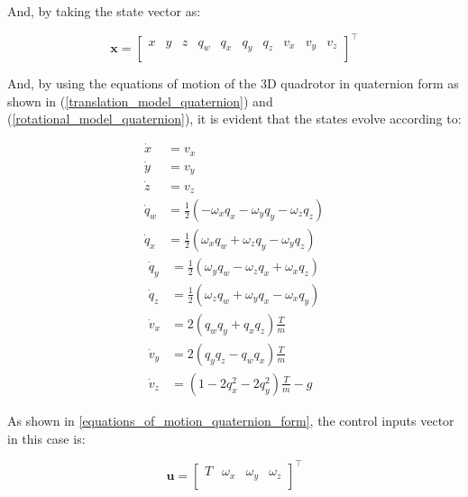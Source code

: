 \documentclass{thesisreport}
\begin{document}
And, by taking the state vector as:

\begin{equation}
	\bm{x} = \begin{bmatrix}
		x & y & z & q_w & q_x & q_y & q_z & v_x & v_y & v_z\\
	\end{bmatrix}^{\intercal}
\end{equation}

And, by using the equations of motion of the 3D quadrotor in quaternion form as shown in (\ref{translation_model_quaternion}) and (\ref{rotational_model_quaternion}), it is evident that the states evolve according to: 

\begin{multicols}{2}
            \begin{align}
                \dot{x} &= v_x \\
                \dot{y} &= v_y \\
                \dot{z} &= v_z \\
                \dot{q}_w &=\frac{1}{2}( - \omega_x q_x - \omega_y q_y - \omega_z q_z) \\
                \dot{q}_x &=\frac{1}{2}( \omega_x q_w + \omega_z q_y - \omega_y q_z)
            \end{align}
        \columnbreak
            \begin{align}
                \dot{q}_y &=\frac{1}{2}( \omega_y q_w - \omega_z q_x + \omega_x q_z) \\
                \dot{q}_z &=\frac{1}{2}( \omega_z q_w + \omega_y q_x - \omega_x q_y) \\
                \dot{v}_x &= 2( q_w q_y + q_x q_z )\frac{T}{m} \\
                \dot{v}_y &= 2(q_y q_z - q_w q_x )\frac{T}{m} \\
                \dot{v}_z &= ( 1 - 2 q_x^2 - 2 q_y^2 )\frac{T}{m} - g
            \end{align}
\end{multicols}

As shown in \ref{equations_of_motion_quaternion_form}, the control inputs vector in this case is: 

\begin{equation}
	\bm{u} = \begin{bmatrix}
		T & \omega_x & \omega_y & \omega_z \\
	\end{bmatrix}^{\intercal}
\end{equation}
\end{document}
